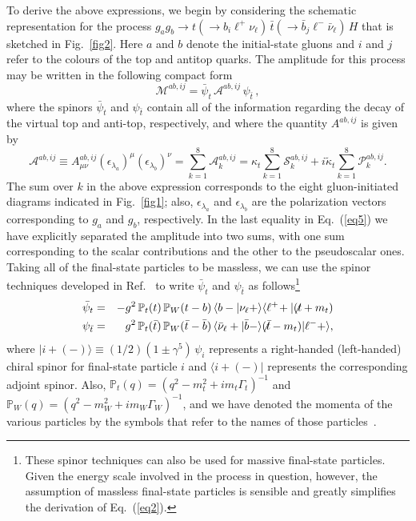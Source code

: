 \documentclass[aps,preprint,tightenlines,floatfix,superscriptaddress,nofootinbib,showpacs]{revtex4-1}
\def\beq{\begin{equation}}
\def\eeq{\end{equation}}
\def\bea{\begin{eqnarray}}
\def\eea{\end{eqnarray}}
\def\tbslash{\tbar\hspace{-10pt}\not{}\hspace{4pt}}
\def\tslash{t\hspace{-10pt}\not{}\hspace{4pt}}
\def\tbar{\bar{t}}
\def\bbar{\bar{b}}
\def\nubar{{\bar{\nu}}_{\ell}}
\def\kp{\kappa_t}
\def\kpt{\tilde{\kappa}_t}
\begin{document}
To derive the above expressions, we begin by considering the
schematic representation for the process $g_ag_b\to t(\to
b_i{\ell}^+\nu_{\ell})\,\tbar(\to \bbar_j {\ell}^- \nubar)\,H$
that is sketched in Fig.~\ref{fig2}.
Here $a$ and $b$ denote the initial-state gluons and
$i$ and $j$ refer to the colours of the top and antitop quarks.
%
The amplitude for this process may be written in the following
compact form
%
\beq
\label{eq6}
\mathcal{M}^{ab,ij}=\bar{\psi}_t\,\mathcal{A}^{ab,ij}\,\psi_{\tbar}\,,
\eeq
%
where the spinors $\bar{\psi}_t$ and $\psi_{\tbar}$
contain all of the information regarding the decay of the
virtual top and anti-top, respectively,
and where the quantity $A^{ab,ij}$ is given by
%
\beq
\label{eq5}
\mathcal{A}^{ab,ij}\equiv A^{ab,ij}_{\mu\nu}(\epsilon_{\lambda_a})^{\mu}(\epsilon_{\lambda_b})^{\nu}=\sum_{k=1}^8 \mathcal{A}^{ab,ij}_k =\kp \sum_{k=1}^8 \mathcal{S}^{ab,ij}_k + i\kpt \sum_{k=1}^8 \mathcal{P}^{ab,ij}_k.
\eeq 
%
The sum over $k$ in the above expression
corresponds to the eight gluon-initiated
diagrams indicated in Fig.~\ref{fig1}; also,
$\epsilon_{\lambda_a}$ and $\epsilon_{\lambda_b}$ are the
polarization vectors corresponding to $g_a$ and $g_b$, respectively.
In the last equality in Eq.~(\ref{eq5})
we have explicitly separated the amplitude into
two sums, with one sum corresponding to the scalar contributions
and the other to the pseudoscalar ones.
Taking all of the final-state particles to be massless, we can use the
spinor techniques
developed in Ref.~\cite{Kleiss} to write $\bar{\psi}_t$ and
$\psi_{\tbar}$ as follows\footnote{These spinor techniques can also be used
  for massive final-state particles. Given the
  energy scale involved in the process in question, however, the assumption
  of massless final-state particles is sensible and greatly
  simplifies the derivation of Eq.~(\ref{eq2}).}
%
\bea
\label{eq7}
\bar{\psi}_t &=& -g^2\, \mathbb{P}_t(t)\,\mathbb{P}_W(t-b)\,
   \langle b-|\nu_{\ell}+\rangle \langle {\ell}^+\!+|(\tslash+m_t)\\
\label{eq8}
\psi_{\tbar} &=& g^2\, \mathbb{P}_t(\tbar)\,\mathbb{P}_W(\tbar-\bbar)\,
   \langle\nubar+|\bbar-\rangle (\tbslash-m_t)|{\ell}^-+\rangle,
\eea
%
where $|i+(-)\rangle \equiv (1/2)(1\pm \gamma^5)\,\psi_i$
represents a right-handed (left-handed) chiral spinor for final-state
particle $i$ and $\langle i+(-)|$ represents the corresponding adjoint spinor.
Also, $\mathbb{P}_t(q)=(q^2-m^2_t+im_t\Gamma_t)^{-1}$ and
$\mathbb{P}_W(q)=(q^2-m^2_W+im_W\Gamma_W)^{-1}$, and
we have denoted the momenta of the various particles by the symbols
that refer to the names of those particles~\cite{Mangano}.
\end{document}
